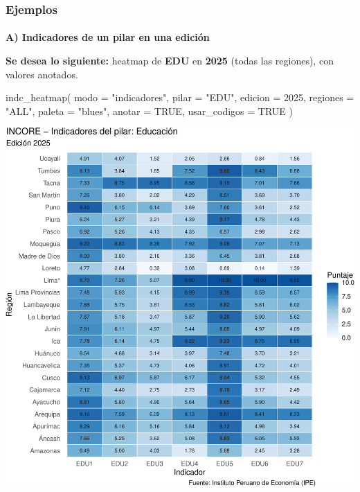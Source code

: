 \documentclass[
  11pt,
  letterpaper,
  DIV=11,
  numbers=noendperiod]{scrartcl}
\makeatletter
\let\oldparagraph\paragraph
\renewcommand{\paragraph}{
    \@ifstar
      \xxxParagraphStar
      \xxxParagraphNoStar
  }
\newcommand{\xxxParagraphStar}[1]{\oldparagraph*{#1}\mbox{}}
\newcommand{\xxxParagraphNoStar}[1]{\oldparagraph{#1}\mbox{}}
\newenvironment{Shaded}{\begin{snugshade}}{\end{snugshade}}
\newcommand{\AttributeTok}[1]{\textcolor[rgb]{0.40,0.45,0.13}{#1}}
\newcommand{\ConstantTok}[1]{\textcolor[rgb]{0.56,0.35,0.01}{#1}}
\newcommand{\DecValTok}[1]{\textcolor[rgb]{0.68,0.00,0.00}{#1}}
\newcommand{\FunctionTok}[1]{\textcolor[rgb]{0.28,0.35,0.67}{#1}}
\newcommand{\NormalTok}[1]{\textcolor[rgb]{0.00,0.23,0.31}{#1}}
\newcommand{\StringTok}[1]{\textcolor[rgb]{0.13,0.47,0.30}{#1}}
\makeatother
\begin{document}
\subsubsection{\texorpdfstring{\textbf{Ejemplos}}{Ejemplos}}\label{ejemplos-18}

\paragraph{\texorpdfstring{\textbf{A) Indicadores de un pilar en una
edición}}{A) Indicadores de un pilar en una edición}}\label{a-indicadores-de-un-pilar-en-una-ediciuxf3n}

\textbf{Se desea lo siguiente:} heatmap de \textbf{EDU} en \textbf{2025}
(todas las regiones), con valores anotados.

\begin{Shaded}
\begin{Highlighting}[]
\FunctionTok{indc\_heatmap}\NormalTok{(}
  \AttributeTok{modo       =} \StringTok{"indicadores"}\NormalTok{,}
  \AttributeTok{pilar      =} \StringTok{"EDU"}\NormalTok{,}
  \AttributeTok{edicion    =} \DecValTok{2025}\NormalTok{,}
  \AttributeTok{regiones   =} \StringTok{"ALL"}\NormalTok{,}
  \AttributeTok{paleta     =} \StringTok{"blues"}\NormalTok{,}
  \AttributeTok{anotar     =} \ConstantTok{TRUE}\NormalTok{,}
  \AttributeTok{usar\_codigos =} \ConstantTok{TRUE}
\NormalTok{)}
\end{Highlighting}
\end{Shaded}

\includegraphics{Manual_files/figure-pdf/unnamed-chunk-100-1.pdf}
\end{document}
